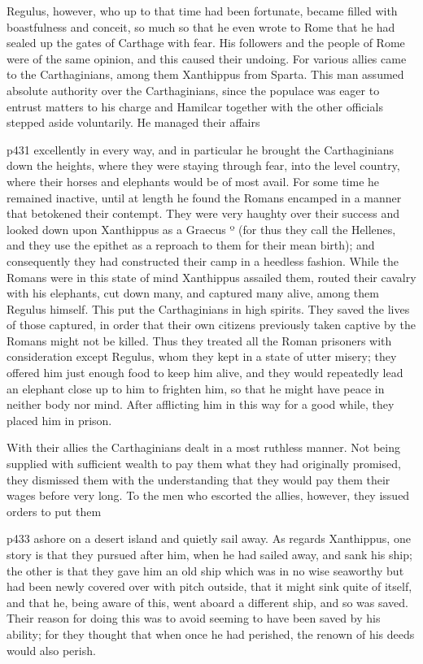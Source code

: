 Regulus, however, who up to that time had been fortunate, became filled with boastfulness and conceit, so much so that he even wrote to Rome that he had sealed up the gates of Carthage with fear. His followers and the people of Rome were of the same opinion, and this caused their undoing. For various allies came to the Carthaginians, among them Xanthippus from Sparta. This man assumed absolute authority over the Carthaginians, since the populace was eager to entrust matters to his charge and Hamilcar together with the other officials stepped aside voluntarily. He managed their affairs

p431 excellently in every way, and in particular he brought the Carthaginians down the heights, where they were staying through fear, into the level country, where their horses and elephants would be of most avail. For some time he remained inactive, until at length he found the Romans encamped in a manner that betokened their contempt. They were very haughty over their success and looked down upon Xanthippus as a Graecus º (for thus they call the Hellenes, and they use the epithet as a reproach to them for their mean birth); and consequently they had constructed their camp in a heedless fashion. While the Romans were in this state of mind Xanthippus assailed them, routed their cavalry with his elephants, cut down many, and captured many alive, among them Regulus himself. This put the Carthaginians in high spirits. They saved the lives of those captured, in order that their own citizens previously taken captive by the Romans might not be killed. Thus they treated all the Roman prisoners with consideration except Regulus, whom they kept in a state of utter misery; they offered him just enough food to keep him alive, and they would repeatedly lead an elephant close up to him to frighten him, so that he might have peace in neither body nor mind. After afflicting him in this way for a good while, they placed him in prison.

With their allies the Carthaginians dealt in a most ruthless manner. Not being supplied with sufficient wealth to pay them what they had originally promised, they dismissed them with the understanding that they would pay them their wages before very long. To the men who escorted the allies, however, they issued orders to put them

p433 ashore on a desert island and quietly sail away. As regards Xanthippus, one story is that they pursued after him, when he had sailed away, and sank his ship; the other is that they gave him an old ship which was in no wise seaworthy but had been newly covered over with pitch outside, that it might sink quite of itself, and that he, being aware of this, went aboard a different ship, and so was saved. Their reason for doing this was to avoid seeming to have been saved by his ability; for they thought that when once he had perished, the renown of his deeds would also perish.


